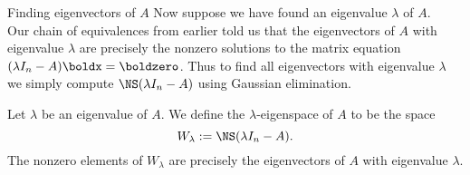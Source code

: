 \begin{frame}{Finding eigenvectors of $A$}
Now suppose we have found an eigenvalue $\lambda$ of $A$. 
\\
Our chain of equivalences from earlier told us that the eigenvectors of $A$ with eigenvalue $\lambda$ are precisely the \alert{nonzero} solutions to the matrix equation $(\lambda I_n-A)\boldx=\boldzero$. 
\bpause 
Thus to find all eigenvectors with eigenvalue $\lambda$ we simply compute $\NS(\lambda I_n-A)$ using Gaussian elimination.
\pause
\begin{definition}
Let $\lambda$ be an eigenvalue of $A$. We define the $\lambda$-eigenspace of $A$ to be the space 
\[
W_\lambda:=\NS(\lambda I_n-A).
\]
The nonzero elements of $W_\lambda$ are precisely the eigenvectors of $A$ with eigenvalue $\lambda$. 
\end{definition}
\end{frame}
